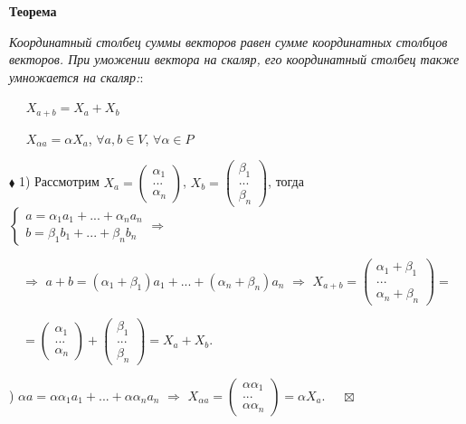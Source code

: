 \documentclass[a4paper, 12pt]{report}
\begin{document}
	\par\bigskip
	\textbf{Теорема}
	
	\textit{Координатный столбец суммы векторов равен сумме координатных столбцов векторов. При уможении вектора на скаляр, его координатный столбец также умножается на скаляр:}:
	
	$\quad$ $X_{a+b} = X_a + X_b$
	
	$\quad$ $X_{\alpha a} = \alpha X_a$, $\forall a, b \in V$, $\forall \alpha \in P$
	\par\bigskip
	$\blacklozenge$ 1) Рассмотрим $X_a=\begin{pmatrix} \alpha_1 \\ ... \\ \alpha_n \end{pmatrix}$, $X_b=\begin{pmatrix} \beta_1 \\ ... \\ \beta_n \end{pmatrix}$, тогда $\begin{cases} a = \alpha_1a_1 + ... + \alpha_n{a_n} \\ b = \beta_1b_1 + ... + \beta_n{b_n} \end{cases} \Rightarrow $
	
	$\quad\Rightarrow$ $a + b = (\alpha_1 + \beta_1)a_1 + ... + (\alpha_n + \beta_n)a_n$ $\Rightarrow$ $X_{a+b} = \begin{pmatrix} \alpha_1 + \beta_1 \\ ... \\ \alpha_n + \beta_n \end{pmatrix} =$ 
	
	$\quad = \begin{pmatrix} \alpha_1 \\ ... \\ \alpha_n \end{pmatrix} + \begin{pmatrix} \beta_1 \\ ... \\ \beta_n \end{pmatrix} = X_a + X_b$.
	\par\bigskip
	
	) $\alpha a = \alpha \alpha_1 a_1 + ... + \alpha \alpha_n a_n$ $\Rightarrow$ $X_{\alpha a} = \begin{pmatrix} \alpha \alpha_1 \\ ... \\ \alpha \alpha_n \end{pmatrix} = \alpha X_a$.
	$\quad\boxtimes$
	
\end{document}
